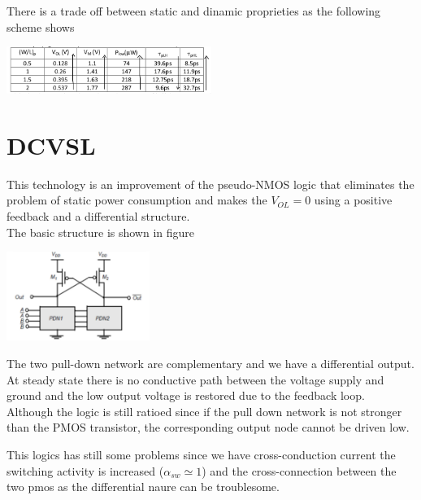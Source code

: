\vspace{5mm}

There is a trade off between static and dinamic proprieties as the following scheme shows

\centering
\includegraphics[width=0.5\textwidth]{C7_3.png}\\
\raggedright





\section{DCVSL}
This technology is an improvement of the pseudo-NMOS logic that eliminates the problem of static power consumption and makes the $V_{OL}=0$ using a positive feedback and a differential structure.\\
The basic structure is shown in figure 

\vspace{2mm}
\centering
\includegraphics[width=0.35\textwidth]{C7_4.png}\\
\raggedright
\vspace{2mm}

The two pull-down network are complementary and we have a differential output.\\
At steady state there is no conductive path between the voltage supply and ground and the low output voltage is restored due to the feedback loop.\\
Although the logic is still ratioed since if the pull down network is not stronger than the PMOS transistor, the corresponding output node cannot be driven low.\\

\vspace{5mm}

This logics has still some problems since we have cross-conduction current the switching activity is increased ($\alpha_{sw}\simeq 1$) and the cross-connection between the two pmos as the differential naure can be troublesome.\\
















